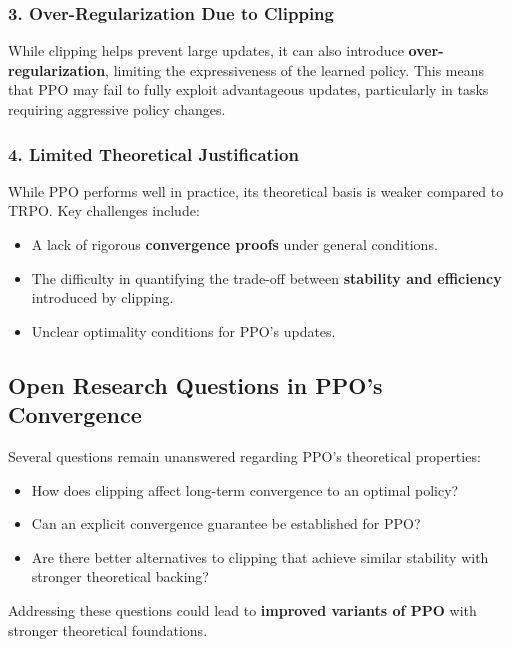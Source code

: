 \documentclass[12pt]{extreport} %
\begin{document}
\subsubsection{3. \textbf{Over-Regularization Due to Clipping}}

While clipping helps prevent large updates, it can also introduce \textbf{over-regularization}, limiting the expressiveness of the learned policy. This means that PPO may fail to fully exploit advantageous updates, particularly in tasks requiring aggressive policy changes.

\subsubsection{4. \textbf{Limited Theoretical Justification}}

While PPO performs well in practice, its theoretical basis is weaker compared to TRPO. Key challenges include:

\begin{itemize}
    \item A lack of rigorous \textbf{convergence proofs} under general conditions.
    \item The difficulty in quantifying the trade-off between \textbf{stability and efficiency} introduced by clipping.
    \item Unclear optimality conditions for PPO's updates.
\end{itemize}

\subsection{\textbf{Open Research Questions in PPO's Convergence}}

Several questions remain unanswered regarding PPO's theoretical properties:

\begin{itemize}
    \item How does clipping affect long-term convergence to an optimal policy?
    \item Can an explicit convergence guarantee be established for PPO?
    \item Are there better alternatives to clipping that achieve similar stability with stronger theoretical backing?
\end{itemize}

Addressing these questions could lead to \textbf{improved variants of PPO} with stronger theoretical foundations.
\end{document}
